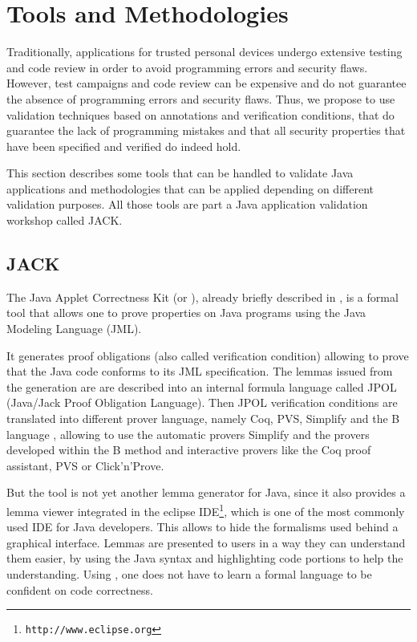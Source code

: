 \section{Tools and Methodologies}
Traditionally, applications for trusted personal devices undergo
extensive testing and code review in order to avoid programming 
errors and security flaws. However, test campaigns and code review
can be expensive and do not guarantee the absence of programming
errors and security flaws. Thus, we propose to use validation
techniques based on annotations and verification conditions,
that do guarantee the lack of programming mistakes and that
all security properties that have been specified and verified
do indeed hold.

This section describes some tools that can be handled to validate Java applications
and methodologies that can be applied depending on different
validation purposes.  All those tools are part a Java application
validation workshop called JACK.

\subsection{JACK}
The Java Applet Correctness Kit (or \JACK), already briefly described in \cite{BRL-JACK}, is
a formal tool that allows one to prove properties on Java programs
using the Java Modeling Language \cite{Leavens-Baker-Ruby03} (JML).

It generates proof obligations (also called verification condition) allowing to prove that the Java code
conforms to its JML specification.  The lemmas issued from the generation are are described into an
internal formula language called JPOL (Java/Jack Proof Obligation
Language). Then JPOL verification conditions are translated into
different prover language, namely Coq, PVS, Simplify and the B
language \cite{bbook}, allowing to use the automatic provers Simplify
and the provers developed within the B method and interactive provers
like the Coq proof assistant, PVS or Click'n'Prove.

 But the tool is not yet another lemma generator for Java, since it
 also provides a lemma viewer integrated in the eclipse
 IDE\footnote{\texttt{http://www.eclipse.org}}, which is one of the
 most commonly used IDE for Java developers.  This allows to hide the
 formalisms used behind a graphical interface.  Lemmas are presented
 to users in a way they can understand them easier, by using the Java
 syntax and highlighting code portions to help the
 understanding. Using \JACK, one does not have to learn a formal
 language to be confident on code correctness.

